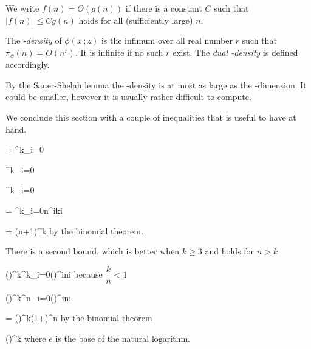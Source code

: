 \documentclass[scombinatorics.tex]{subfiles}
\begin{document}
We write $f(n)=O(g(n))$ if there is a constant $C$ such that $|f(n)|\le C g(n)$ holds for all (sufficiently large) $n$.

The \emph{\vc-density\/} of $\phi(x\,;z)$ is the infimum over all real number $r$ such that $\pi_\phi(n)= O(n^r)$.
It is infinite if no such $r$ exist.
The  \emph{dual \vc-density\/} is defined accordingly.

By the Sauer-Shelah lemma the \vc-density is at most as large as the \vc-dimension.
It could be smaller, however it is usually rather difficult to compute.

We conclude this section with a couple of inequalities that is useful to have at hand.

{=}
{\sum^k_{i=0}}

\ceq{}
{\le}
{\sum^k_{i=0}}

\ceq{}
{\le}
{\sum^k_{i=0}}

\ceq{}
{=}
{\sum^k_{i=0}n^i{k\choose i}}

\ceq{}
{=}
{(n+1)^k}
\hfill by the binomial theorem.\smallskip

There is a second bound, which is better when $k\ge 3$ and holds for $n>k$

{\le}
{\Big(\Big)^{\!k}\sum^k_{i=0}\Big(\Big)^{\!i}{n\choose i}}
\hfill because $\dfrac{k}{n}<1$

\ceq{}
{\le}
{\Big(\Big)^{\!k}\sum^n_{i=0}\Big(\Big)^{\!i}{n\choose i}}

\ceq{}
{=}
{\Big(\Big)^{\!k}\Big(1+\Big)^n}
\hfill by the binomial theorem

\ceq{}
{\le}
{\Big(\Big)^{\!k}}
\hfill where $e$ is the base of the natural logarithm.
\end{document}
